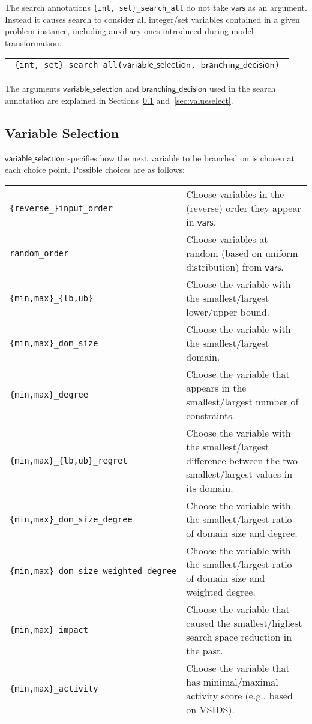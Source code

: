 \documentclass[a4paper]{article}
\newcommand{\fz}[1]{\texttt{#1}}
\newcommand{\fzsf}[1]{\ensuremath{\mathsf{#1}}}
\newcommand{\fzvars}{\fzsf{vars}}
\newcommand{\fzvarchoiceannotation}{\fzsf{variable\_selection}}
\newcommand{\fznassignmentannotation}{\fzsf{branching\_decision}}
\begin{document}
The search annotations \fz{\{int, set\}\_search\_all} do not take \fzvars{} as an
argument.  Instead it causes search to consider all integer/set variables contained
in a given problem instance, including auxiliary ones introduced during model
transformation.

\begin{tabular}{l}
\fz{
\{int, set\}\_search\_all(\fzvarchoiceannotation, \fznassignmentannotation)
}
\\
\end{tabular}


The arguments \fz{\fzvarchoiceannotation} and \fz{\fznassignmentannotation}
used in the search annotation are explained in Sections~\ref{sec:varselect}
and~\ref{sec:valueselect}. 

\subsection{Variable Selection}
\label{sec:varselect}
\fzvarchoiceannotation{} specifies how the next variable to be branched on is
chosen at each choice point.  Possible choices are as follows:

\begin{tabular}{p{.45\linewidth}p{.5\linewidth}}
\fz{\{reverse\_\}input\_order}
& Choose variables in the (reverse) order they appear in \fzvars.\\
\fz{random\_order}
& Choose variables at random (based on uniform distribution) from \fzvars.\\
\fz{\{min,max\}\_\{lb,ub\}}
& Choose the variable with the smallest/largest lower/upper bound.\\
\fz{\{min,max\}\_dom\_size}
& Choose the variable with the smallest/largest domain.\\
\fz{\{min,max\}\_degree}
& Choose the variable that appears in the smallest/largest number of
  constraints.\\
\fz{\{min,max\}\_\{lb,ub\}\_regret}
& Choose the variable with the smallest/largest difference between the two
smallest/largest values in its domain.\\
\fz{\{min,max\}\_dom\_size\_degree}
& Choose the variable with the smallest/largest ratio of domain size and degree.\\
\fz{\{min,max\}\_dom\_size\_weighted\_degree}
& Choose the variable with the smallest/largest ratio of domain size and
  weighted degree.\\
\fz{\{min,max\}\_impact}
& Choose the variable that caused the smallest/highest search space reduction
  in the past.\\
\fz{\{min,max\}\_activity}
& Choose the variable that has minimal/maximal activity score (e.g., based on VSIDS).\\
\end{tabular}
\end{document}

